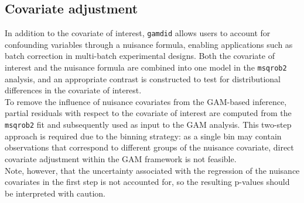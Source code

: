 \subsection{Covariate adjustment}
In addition to the covariate of interest, \texttt{gamdid} allows users to account
for confounding variables through a nuisance formula, enabling applications such
as batch correction in multi-batch experimental designs. Both the covariate of
interest and the nuisance formula are combined into one model in the \texttt{msqrob2}
analysis, and an appropriate contrast is constructed to test for distributional
differences in the covariate of interest.\\
To remove the influence of nuisance covariates from the GAM-based inference,
partial residuals with respect to the covariate of interest are computed from
the \texttt{msqrob2} fit and subsequently used as input to the GAM analysis.
This two-step approach is required due to the binning strategy: as a single bin
may contain observations that correspond to different groups of the nuisance
covariate, direct covariate adjustment within the GAM framework is not feasible.\\
Note, however, that the uncertainty associated with the regression of the nuisance
covariates in the first step is not accounted for, so the resulting p-values should be
interpreted with caution.

